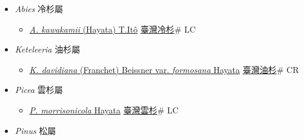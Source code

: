 
  \begin{itemize}
 \item[] \textit{Abies} 冷杉屬
                    
  \begin{itemize}
        \item[] \href{http://www.theplantlist.org/tpl1.1/search?q=Abies+kawakamii}{\textit{A. kawakamii} (Hayata) T.Itô}   \href{\detokenize{http://taibnet.sinica.edu.tw/chi/taibnet_species_list.php?T2=臺灣冷杉&T2_new_value=true&fr=y}}{臺灣冷杉}\# LC
  \end{itemize}
 \item[] \textit{Keteleeria} 油杉屬
                    
  \begin{itemize}
        \item[] \href{http://www.theplantlist.org/tpl1.1/search?q=Keteleeria+davidiana+var.+formosana}{\textit{K. davidiana} (Franchet) Beissner var. \textit{formosana} Hayata}   \href{\detokenize{http://taibnet.sinica.edu.tw/chi/taibnet_species_list.php?T2=臺灣油杉&T2_new_value=true&fr=y}}{臺灣油杉}\# CR
  \end{itemize}
 \item[] \textit{Picea} 雲杉屬
                    
  \begin{itemize}
        \item[] \href{http://www.theplantlist.org/tpl1.1/search?q=Picea+morrisonicola}{\textit{P. morrisonicola} Hayata}   \href{\detokenize{http://taibnet.sinica.edu.tw/chi/taibnet_species_list.php?T2=臺灣雲杉&T2_new_value=true&fr=y}}{臺灣雲杉}\# LC
  \end{itemize}
 \item[] \textit{Pinus} 松屬
                    

\end{itemize}
